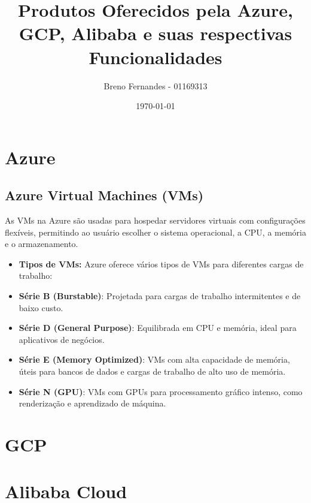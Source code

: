 \documentclass[a4paper,12pt]{article}
\title{Produtos Oferecidos pela Azure, GCP, Alibaba e suas respectivas Funcionalidades}
\author{Breno Fernandes - 01169313}
\date{\today}
\begin{document}
\maketitle

\break

\section*{Azure}

\subsection*{Azure Virtual Machines (VMs)}
As VMs na Azure são usadas para hospedar servidores virtuais com configurações flexíveis, permitindo ao usuário escolher o sistema operacional, a CPU, a memória e o armazenamento.
\begin{itemize}[left=0pt]
  \item \textbf{Tipos de VMs:}
Azure oferece vários tipos de VMs para diferentes cargas de trabalho:

\item \textbf{Série B (Burstable)}: Projetada para cargas de trabalho intermitentes e de baixo custo.
\item \textbf{Série D (General Purpose)}: Equilibrada em CPU e memória, ideal para aplicativos de negócios.
\item \textbf{Série E (Memory Optimized)}: VMs com alta capacidade de memória, úteis para bancos de dados e cargas de trabalho de alto uso de memória.
\item \textbf{Série N (GPU)}: VMs com GPUs para processamento gráfico intenso, como renderização e aprendizado de máquina.
  
\end{itemize}

\break

\section*{GCP}

\break

\section*{Alibaba Cloud}
\end{document}
